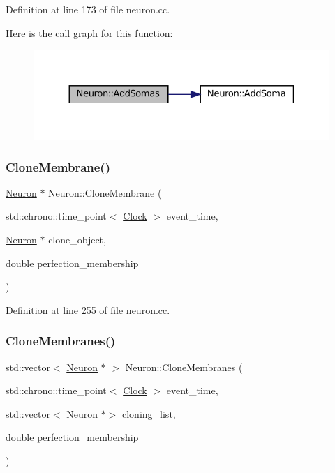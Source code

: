 Definition at line 173 of file neuron.\+cc.

Here is the call graph for this function\+:\nopagebreak
\begin{figure}[H]
\begin{center}
\leavevmode
\includegraphics[width=330pt]{class_neuron_a78a0f48a669b6ea20280829304e51de2_cgraph}
\end{center}
\end{figure}
\mbox{\label{class_neuron_ab85f7c42466657095efb3aca5a9ee71d}} 
\subsubsection{\texorpdfstring{Clone\+Membrane()}{CloneMembrane()}}
{\footnotesize\ttfamily \mbox{\hyperlink{class_neuron}{Neuron}} $\ast$ Neuron\+::\+Clone\+Membrane (\begin{DoxyParamCaption}\item[{std\+::chrono\+::time\+\_\+point$<$ \mbox{\hyperlink{universe_8h_a0ef8d951d1ca5ab3cfaf7ab4c7a6fd80}{Clock}} $>$}]{event\+\_\+time,  }\item[{\mbox{\hyperlink{class_neuron}{Neuron}} $\ast$}]{clone\+\_\+object,  }\item[{double}]{perfection\+\_\+membership }\end{DoxyParamCaption})}



Definition at line 255 of file neuron.\+cc.

\mbox{\label{class_neuron_ae119d77522a4f11f5d9b1e935a9c80ba}} 
\subsubsection{\texorpdfstring{Clone\+Membranes()}{CloneMembranes()}}
{\footnotesize\ttfamily std\+::vector$<$ \mbox{\hyperlink{class_neuron}{Neuron}} $\ast$ $>$ Neuron\+::\+Clone\+Membranes (\begin{DoxyParamCaption}\item[{std\+::chrono\+::time\+\_\+point$<$ \mbox{\hyperlink{universe_8h_a0ef8d951d1ca5ab3cfaf7ab4c7a6fd80}{Clock}} $>$}]{event\+\_\+time,  }\item[{std\+::vector$<$ \mbox{\hyperlink{class_neuron}{Neuron}} $\ast$$>$}]{cloning\+\_\+list,  }\item[{double}]{perfection\+\_\+membership }\end{DoxyParamCaption})}



